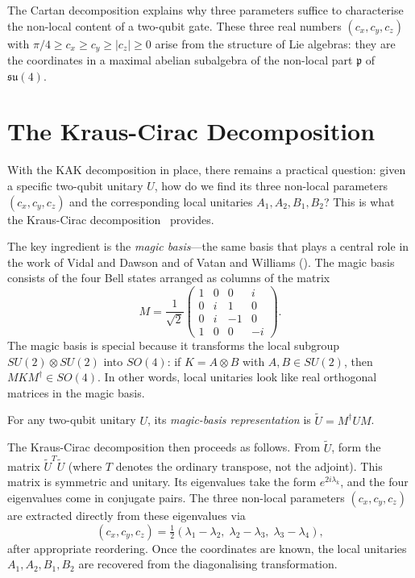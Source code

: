 \documentclass[12pt, a4paper, oneside]{report}
\theoremstyle{plain}
\theoremstyle{definition}
\theoremstyle{remark}
\begin{document}
The Cartan decomposition explains why three parameters suffice to characterise
the non-local content of a two-qubit gate. These three real numbers $(c_x, c_y, c_z)$
with $\pi/4 \geq c_x \geq c_y \geq |c_z| \geq 0$ arise from the structure of Lie algebras:
they are the coordinates in a maximal abelian subalgebra of the non-local part
$\mathfrak{p}$ of $\mathfrak{su}(4)$.


\section{The Kraus-Cirac Decomposition}

With the KAK decomposition in place, there remains a practical question: given a specific
two-qubit unitary $U$, how do we find its three non-local parameters $(c_x, c_y, c_z)$ and
the corresponding local unitaries $A_1, A_2, B_1, B_2$? This is what the Kraus-Cirac
decomposition~\cite{kraus2001} provides.

The key ingredient is the \emph{magic basis}---the same basis that plays a central role in
the work of Vidal and Dawson and of Vatan and Williams (). The magic
basis consists of the four Bell states arranged as columns of the matrix
\[
	M = \frac{1}{\sqrt{2}}
	\begin{pmatrix}1 & 0 & 0 & i \\ 0 & i & 1 & 0 \\ 0 & i & -1 & 0 \\ 1 & 0 & 0 & -i\end{pmatrix}.
\]
The magic basis is special because it transforms the local subgroup $SU(2) \otimes SU(2)$
into $SO(4)$: if $K = A \otimes B$ with $A, B \in SU(2)$, then $M K M^\dagger \in SO(4)$.
In other words, local unitaries look like real orthogonal matrices in the magic basis.

For any two-qubit unitary $U$, its \emph{magic-basis representation} is
$\tilde{U} = M^\dagger U M$.

The Kraus-Cirac decomposition then proceeds as follows. From $\tilde{U}$, form the matrix
$\tilde{U}^T \tilde{U}$ (where $T$ denotes the ordinary transpose, not the adjoint). This
matrix is symmetric and unitary. Its eigenvalues take the form $e^{2i\lambda_k}$, and the
four eigenvalues come in conjugate pairs. The three non-local parameters $(c_x, c_y, c_z)$
are extracted directly from these eigenvalues via
\[
	(c_x, c_y, c_z)
	= \tfrac{1}{2}(\lambda_1 - \lambda_2,\;\lambda_2 - \lambda_3,\;\lambda_3 - \lambda_4),
\]
after appropriate reordering. Once the coordinates are known, the local unitaries
$A_1, A_2, B_1, B_2$ are recovered from the diagonalising transformation.
\end{document}
